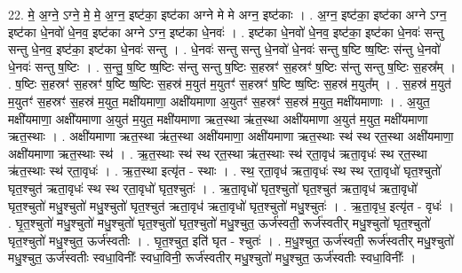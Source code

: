 \documentclass[17pt]{extarticle}
\begin{document}
22. मे॒ अ॒ग्ने॒ ऽग्ने॒ मे॒ मे॒ अ॒ग्न॒ इष्ट॑का॒ इष्ट॑का अग्ने मे मे अग्न॒ इष्ट॑काः । . अ॒ग्न॒ इष्ट॑का॒ इष्ट॑का अग्ने ऽग्न॒ इष्ट॑का धे॒नवो॑ धे॒नव॒ इष्ट॑का अग्ने ऽग्न॒ इष्ट॑का धे॒नवः॑ । . इष्ट॑का धे॒नवो॑ धे॒नव॒ इष्ट॑का॒ इष्ट॑का धे॒नवः॑ सन्तु सन्तु धे॒नव॒ इष्ट॑का॒ इष्ट॑का धे॒नवः॑ सन्तु । . धे॒नवः॑ सन्तु सन्तु धे॒नवो॑ धे॒नवः॑ सन्तु ष॒ष्टि ष्ष॒ष्टिः स॑न्तु धे॒नवो॑ धे॒नवः॑ सन्तु ष॒ष्टिः । . स॒न्तु॒ ष॒ष्टि ष्ष॒ष्टिः स॑न्तु सन्तु ष॒ष्टिः स॒हस्रꣳ॑ स॒हस्रꣳ॑ ष॒ष्टिः स॑न्तु सन्तु ष॒ष्टिः स॒हस्र᳚म् । . ष॒ष्टिः स॒हस्रꣳ॑ स॒हस्रꣳ॑ ष॒ष्टि ष्ष॒ष्टिः स॒हस्र॑ म॒युत॑ म॒युतꣳ॑ स॒हस्रꣳ॑ ष॒ष्टि ष्ष॒ष्टिः स॒हस्र॑ म॒युत᳚म् । . स॒हस्र॑ म॒युत॑ म॒युतꣳ॑ स॒हस्रꣳ॑ स॒हस्र॑ म॒युत॒ मक्षी॑यमाणा॒ अक्षी॑यमाणा अ॒युतꣳ॑ स॒हस्रꣳ॑ स॒हस्र॑ म॒युत॒ मक्षी॑यमाणाः । . अ॒युत॒ मक्षी॑यमाणा॒ अक्षी॑यमाणा अ॒युत॑ म॒युत॒ मक्षी॑यमाणा ऋत॒स्था ऋ॑त॒स्था अक्षी॑यमाणा अ॒युत॑ म॒युत॒ मक्षी॑यमाणा ऋत॒स्थाः । . अक्षी॑यमाणा ऋत॒स्था ऋ॑त॒स्था अक्षी॑यमाणा॒ अक्षी॑यमाणा ऋत॒स्थाः स्थ॑ स्थ र्‌त॒स्था अक्षी॑यमाणा॒ अक्षी॑यमाणा ऋत॒स्थाः स्थ॑ । . ऋ॒त॒स्थाः स्थ॑ स्थ र्‌त॒स्था ऋ॑त॒स्थाः स्थ॑ र्‌ता॒वृध॑ ऋता॒वृधः॑ स्थ र्‌त॒स्था ऋ॑त॒स्थाः स्थ॑ र्‌ता॒वृधः॑ । . ऋ॒त॒स्था इत्यृ॑त - स्थाः । . स्थ॒ र्‌ता॒वृध॑ ऋता॒वृधः॑ स्थ स्थ र्‌ता॒वृधो॑ घृत॒श्चुतो॑ घृत॒श्चुत॑ ऋता॒वृधः॑ स्थ स्थ र्‌ता॒वृधो॑ घृत॒श्चुतः॑ । . ऋ॒ता॒वृधो॑ घृत॒श्चुतो॑ घृत॒श्चुत॑ ऋता॒वृध॑ ऋता॒वृधो॑ घृत॒श्चुतो॑ मधु॒श्चुतो॑ मधु॒श्चुतो॑ घृत॒श्चुत॑ ऋता॒वृध॑ ऋता॒वृधो॑ घृत॒श्चुतो॑ मधु॒श्चुतः॑ । . ऋ॒ता॒वृध॒ इत्यृ॑त - वृधः॑ । . घृ॒त॒श्चुतो॑ मधु॒श्चुतो॑ मधु॒श्चुतो॑ घृत॒श्चुतो॑ घृत॒श्चुतो॑ मधु॒श्चुत॒ ऊर्ज॑स्वती॒ रूर्ज॑स्वतीर् मधु॒श्चुतो॑ घृत॒श्चुतो॑ घृत॒श्चुतो॑ मधु॒श्चुत॒ ऊर्ज॑स्वतीः । . घृ॒त॒श्चुत॒ इति॑ घृत - श्चुतः॑ । . म॒धु॒श्चुत॒ ऊर्ज॑स्वती॒ रूर्ज॑स्वतीर् मधु॒श्चुतो॑ मधु॒श्चुत॒ ऊर्ज॑स्वतीः स्वधा॒विनीः᳚ स्वधा॒विनी॒ रूर्ज॑स्वतीर् मधु॒श्चुतो॑ मधु॒श्चुत॒ ऊर्ज॑स्वतीः स्वधा॒विनीः᳚ । \newline
\end{document}
